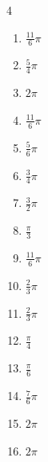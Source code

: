 \begin{multicols}{4}
\begin{enumerate}
  \item $\displaystyle \frac{11}{6}\pi$

  \item $\displaystyle \frac{5}{4}\pi$

  \item $\displaystyle 2\pi$

  \item $\displaystyle \frac{11}{6}\pi$

  \item $\displaystyle \frac{5}{6}\pi$

  \item $\displaystyle \frac{3}{4}\pi$

  \item $\displaystyle \frac{3}{2}\pi$

  \item $\displaystyle \frac{\pi}{3}$

  \item $\displaystyle \frac{11}{6}\pi$

  \item $\displaystyle \frac{2}{3}\pi$

  \item $\displaystyle \frac{2}{3}\pi$

  \item $\displaystyle \frac{\pi}{4}$

  \item $\displaystyle \frac{\pi}{6}$

  \item $\displaystyle \frac{7}{6}\pi$

  \item $\displaystyle 2\pi$

  \item $\displaystyle 2\pi$


\end{enumerate}
\end{multicols}

